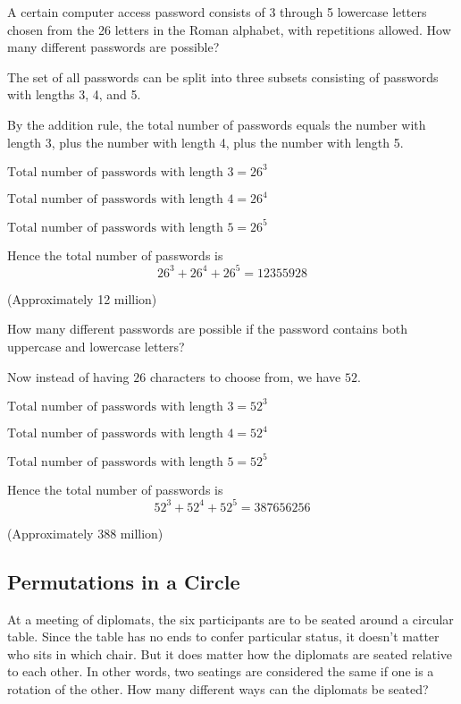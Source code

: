 \documentclass[11pt,a4paper]{book}
\begin{document}
\begin{example}

A certain computer access password consists of 3 through 5 lowercase
letters chosen from the 26 letters in the Roman alphabet, with repetitions
allowed. How many different passwords are possible?

The set of all passwords can be split into three subsets consisting
of passwords with lengths 3, 4, and 5.

By the addition rule, the total number of passwords equals the number
with length 3, plus the number with length 4, plus the number with
length 5.

$\text{Total number of passwords with length 3}=26^{3}$

$\text{Total number of passwords with length 4}=26^{4}$

$\text{Total number of passwords with length 5}=26^{5}$

Hence the total number of passwords is
\[
26^{3}+26^{4}+26^{5}=12355928
\]

(Approximately 12 million)

How many different passwords are possible if the password contains
both uppercase and lowercase letters?

Now instead of having $26$ characters to choose from, we have $52$.

$\text{Total number of passwords with length 3}=52^{3}$

$\text{Total number of passwords with length 4}=52^{4}$

$\text{Total number of passwords with length 5}=52^{5}$

Hence the total number of passwords is
\[
52^{3}+52^{4}+52^{5}=387656256
\]

(Approximately 388 million)

\end{example}

\subsection{Permutations in a Circle }

At a meeting of diplomats, the six participants are to be seated around
a circular table. Since the table has no ends to confer particular
status, it doesn\textquoteright t matter who sits in which chair.
But it does matter how the diplomats are seated relative to each other.
In other words, two seatings are considered the same if one is a rotation
of the other. How many different ways can the diplomats be seated?
\end{document}

